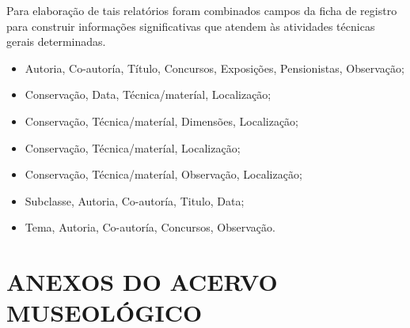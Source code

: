 Para elaboração de tais relatórios foram combinados campos da ficha de registro para construir informações significativas que atendem às atividades técnicas gerais determinadas.
\begin{itemize}
	\item Autoria, Co-autoría, Título, Concursos, Exposições, Pensionistas, Observação;
	\item Conservação, Data, Técnica/materíal, Localização;
	\item Conservação, Técnica/materíal, Dimensões, Localização;
	\item Conservação, Técnica/materíal, Localização;
	\item Conservação, Técnica/materíal, Observação, Localização;
	\item Subclasse, Autoria, Co-autoría, Titulo, Data;
	\item Tema, Autoria, Co-autoría, Concursos, Observação.
\end{itemize}


\section{ANEXOS DO ACERVO MUSEOLÓGICO}
